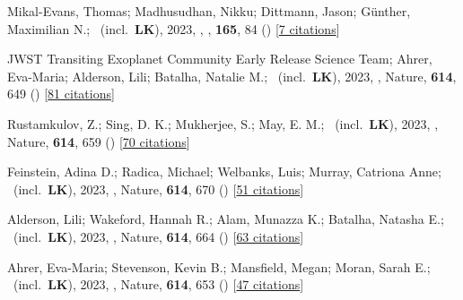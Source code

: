 \item[{\color{numcolor}\scriptsize85}] Mikal-Evans, Thomas; Madhusudhan, Nikku; Dittmann, Jason; G{\"u}nther, Maximilian N.; \etal\ (incl.\ \textbf{LK}), 2023, , \aj, \textbf{165}, 84 () [\href{https://ui.adsabs.harvard.edu/abs/2023AJ....165...84M}{7 citations}]

\item[{\color{numcolor}\scriptsize84}] JWST Transiting Exoplanet Community Early Release Science Team; Ahrer, Eva-Maria; Alderson, Lili; Batalha, Natalie M.; \etal\ (incl.\ \textbf{LK}), 2023, , Nature, \textbf{614}, 649 () [\href{https://ui.adsabs.harvard.edu/abs/2023Natur.614..649J}{81 citations}]

\item[{\color{numcolor}\scriptsize83}] Rustamkulov, Z.; Sing, D. K.; Mukherjee, S.; May, E. M.; \etal\ (incl.\ \textbf{LK}), 2023, , Nature, \textbf{614}, 659 () [\href{https://ui.adsabs.harvard.edu/abs/2023Natur.614..659R}{70 citations}]

\item[{\color{numcolor}\scriptsize82}] Feinstein, Adina D.; Radica, Michael; Welbanks, Luis; Murray, Catriona Anne; \etal\ (incl.\ \textbf{LK}), 2023, , Nature, \textbf{614}, 670 () [\href{https://ui.adsabs.harvard.edu/abs/2023Natur.614..670F}{51 citations}]

\item[{\color{numcolor}\scriptsize81}] Alderson, Lili; Wakeford, Hannah R.; Alam, Munazza K.; Batalha, Natasha E.; \etal\ (incl.\ \textbf{LK}), 2023, , Nature, \textbf{614}, 664 () [\href{https://ui.adsabs.harvard.edu/abs/2023Natur.614..664A}{63 citations}]

\item[{\color{numcolor}\scriptsize80}] Ahrer, Eva-Maria; Stevenson, Kevin B.; Mansfield, Megan; Moran, Sarah E.; \etal\ (incl.\ \textbf{LK}), 2023, , Nature, \textbf{614}, 653 () [\href{https://ui.adsabs.harvard.edu/abs/2023Natur.614..653A}{47 citations}]

